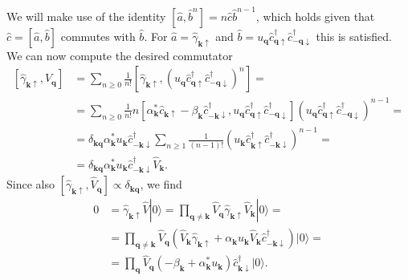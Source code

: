 \documentclass[english, parskip=full]{scrartcl}
\newcommand{\kla}{}
\newcommand{\klam}{}
\newcommand{\Ket}{}
\begin{document}
We will make use of the identity $\klam\left[ \hat{a}, \hat{b}^n \right] = n\hat{c}\hat{b}^{n-1}$, which holds given that $\hat{c} = \klam\left[ \hat{a}, \hat{b} \right]$ commutes with $\hat{b}$.
For $\hat{a} = \hat{\gamma}_{\mathbf{k}\uparrow}$ and $\hat{b} = u_{\mathbf{q}} \hat{c}_{\mathbf{q}\uparrow}^\dagger \hat{c}_{-\mathbf{q}\downarrow}^\dagger$ this is satisfied.
We can now compute the desired commutator
\begin{align}
\klam\left[ \hat{\gamma}_{\mathbf{k}\uparrow}, \hat{V}_{\mathbf{q}} \right] &= \sum_{n\ge 0} \frac{1}{n!} \klam\left[ \hat{\gamma}_{\mathbf{k}\uparrow}, \kla\left( u_{\mathbf{q}} \hat{c}_{\mathbf{q}\uparrow}^\dagger \hat{c}_{-\mathbf{q}\downarrow}^\dagger \right)^n \right] = \\
&= \sum_{n\ge 0}\frac{1}{n!} n \klam\left[ \alpha_{\mathbf{k}}^\ast \hat{c}_{\mathbf{k}\uparrow} - \beta_{\mathbf{k}} \hat{c}_{-\mathbf{k}\downarrow}^\dagger, u_{\mathbf{q}} \hat{c}_{\mathbf{q}\uparrow}^\dagger \hat{c}_{-\mathbf{q}\downarrow}^\dagger \right] \kla\left( u_{\mathbf{q}} \hat{c}_{\mathbf{q}\uparrow}^\dagger \hat{c}_{-\mathbf{q}\downarrow}^\dagger \right)^{n-1} = \\
&= \delta_{\mathbf{k}\textbf{q}} \alpha_{\mathbf{k}}^\ast u_{\mathbf{k}} \hat{c}_{-\mathbf{k}\downarrow}^\dagger \sum_{n\ge 1} \frac{1}{(n-1)!} \kla\left( u_{\mathbf{k}} \hat{c}_{\mathbf{k}\uparrow}^\dagger \hat{c}_{-\mathbf{k}\downarrow}^\dagger \right)^{n-1} = \\
&= \delta_{\mathbf{k}\textbf{q}} \alpha_{\mathbf{k}}^\ast u_{\mathbf{k}} \hat{c}_{-\mathbf{k}\downarrow}^\dagger \hat{V}_{\mathbf{k}}.
\end{align}
Since also $\klam\left[ \hat{\gamma}_{\mathbf{k}\uparrow}, \hat{V}_{\mathbf{q}} \right] \propto \delta_{\mathbf{k}\textbf{q}}$, we find 
\begin{align}
0 &= \hat{\gamma}_{\mathbf{k}\uparrow}\hat{V} \Ket | 0 \rangle = \prod_{\mathbf{q\neq k}} \hat{V}_{\mathbf{q}} \hat{\gamma}_{\mathbf{k}\uparrow} \hat{V}_{\mathbf{k}} \Ket | 0 \rangle = \\
&= \prod_{\mathbf{q\neq k}} \hat{V}_{\mathbf{q}} \kla\left( \hat{V}_{\textbf{k}} \hat{\gamma}_{\mathbf{k}\uparrow} + \alpha_{\mathbf{k}} u_{\mathbf{k}} \hat{V}_{\mathbf{k}} \hat{c}_{-\mathbf{k}\downarrow}^\dagger  \right) \Ket | 0 \rangle = \\
&= \prod_{\mathbf{q}} \hat{V}_{\mathbf{q}} \left( - \beta_{\mathbf{k}} + \alpha_{\mathbf{k}}^\ast u_{\mathbf{k}} \right) \hat{c}_{\mathbf{k}\downarrow}^\dagger \Ket | 0 \rangle.
\end{align}
\end{document}
